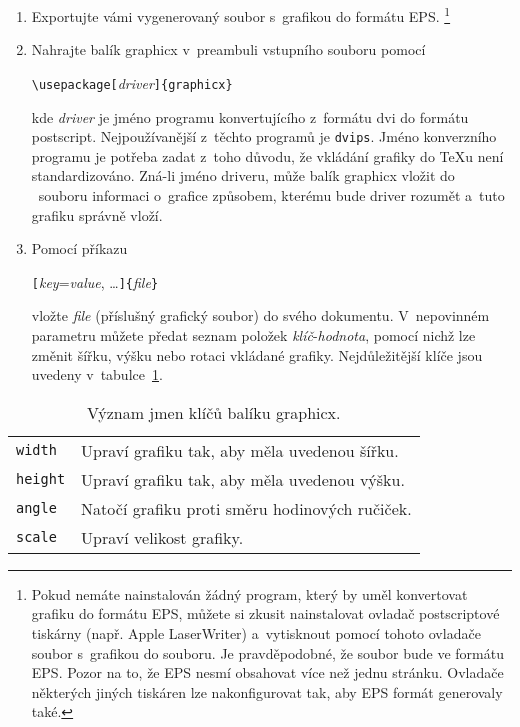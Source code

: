 \begin{enumerate}
\item Exportujte vámi vygenerovaný soubor s~grafikou do formátu EPS.%
    \footnote{Pokud nemáte nainstalován žádný program, který
    by uměl konvertovat grafiku do formátu EPS, můžete si zkusit
    nainstalovat ovladač postscriptové tiskárny (např. \mbox{Apple} LaserWriter)
    a~vytisknout pomocí tohoto ovladače soubor s~grafikou do souboru.
    Je pravděpodobné, že  soubor bude ve formátu EPS.
    Pozor na to, že EPS nesmí obsahovat více než jednu stránku.
    Ovladače některých jiných tiskáren lze nakonfigurovat tak, aby EPS
    formát generovaly také.}%
\item Nahrajte balík \textsf{graphicx} v~preambuli vstupního souboru
    pomocí
\begin{lscommand}
\verb|\usepackage[|\emph{driver}\verb|]{graphicx}|
\end{lscommand}
\noindent kde \emph{driver} je jméno programu konvertujícího
z~formátu dvi do formátu postscript. Nejpoužívanější z~těchto
programů je \texttt{dvips}. Jméno konverzního programu je
potřeba zadat z~toho důvodu, že vkládání grafiky do \TeX u
není standardizováno. Zná-li jméno driveru, může balík \textsf{graphicx}
vložit do ~souboru informaci o~grafice způsobem, kterému
bude driver rozumět a~tuto grafiku správně vloží.
\item Pomocí příkazu
\begin{lscommand}
\verb|[|\emph{key}=\emph{value}, \ldots\verb|]{|\emph{file}\verb|}|
\end{lscommand}
\noindent vložte \emph{file} (příslušný grafický soubor) do
svého dokumentu. V~nepovinném parametru
můžete předat seznam položek \emph{klíč}-\emph{hodnota}, pomocí nichž
lze změnit šířku, výšku nebo rotaci vkládané grafiky. Nejdůležitější
klíče jsou uvedeny v~tabulce~\ref{keyvals}.
\end{enumerate}

\begin{table}[!bht]
\caption{Význam jmen klíčů balíku \textsf{graphicx}.}
\label{keyvals}
\begin{lined}{10cm}
\begin{tabular}{@{}ll}
\texttt{width}&  Upraví grafiku tak, aby měla uvedenou šířku.\\
\texttt{height}& Upraví grafiku tak, aby měla uvedenou výšku.\\
\texttt{angle}&  Natočí grafiku proti směru hodinových ručiček.\\
\texttt{scale}&  Upraví velikost grafiky.\\
\end{tabular}

\bigskip
\end{lined}
\end{table}

